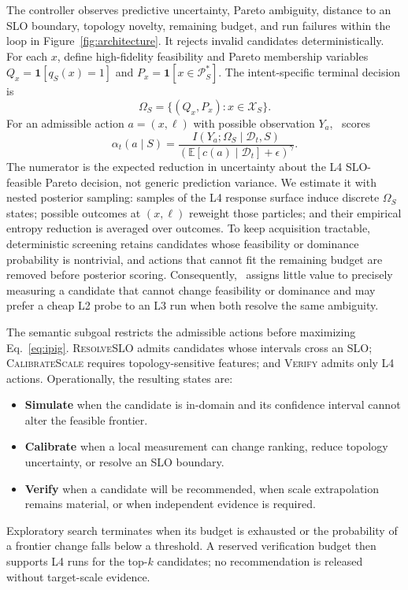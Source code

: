 The controller observes predictive uncertainty, Pareto ambiguity, distance to
an SLO boundary, topology novelty, remaining budget, and run failures within
the loop in Figure~\ref{fig:architecture}.  It rejects invalid candidates
deterministically.  For each $x$, define high-fidelity feasibility and Pareto
membership variables $Q_x=\mathbf 1[q_S(x)=1]$ and
$P_x=\mathbf 1[x\in\mathcal P_S^*]$.  The intent-specific terminal decision is
\begin{equation}
\Omega_S=\{(Q_x,P_x):x\in\mathcal X_S\}.
\end{equation}
For an admissible action $a=(x,\ell)$ with possible observation $Y_a$, \ipig{}\
scores
\begin{equation}
\alpha_t(a\mid S)=
\frac{I(Y_a;\Omega_S\mid\mathcal D_t,S)}
{(\mathbb E[c(a)\mid\mathcal D_t]+\epsilon)^\gamma}.
\label{eq:ipig}
\end{equation}
The numerator is the expected reduction in uncertainty about the L4
SLO-feasible Pareto decision, not generic prediction variance.  We estimate it
with nested posterior sampling: samples of the L4 response surface induce
discrete $\Omega_S$ states; possible outcomes at $(x,\ell)$ reweight those
particles; and their empirical entropy reduction is averaged over outcomes.
To keep acquisition tractable, deterministic screening retains candidates
whose feasibility or dominance probability is nontrivial, and actions that
cannot fit the remaining budget are removed before posterior scoring.
Consequently, \ipig{}\ assigns little value to precisely measuring a candidate
that cannot change feasibility or dominance and may prefer a cheap L2 probe to
an L3 run when both resolve the same ambiguity.

The semantic subgoal restricts the admissible actions before maximizing
Eq.~\ref{eq:ipig}.  \textsc{ResolveSLO} admits candidates whose intervals
cross an SLO; \textsc{CalibrateScale} requires topology-sensitive features;
and \textsc{Verify} admits only L4 actions.  Operationally, the resulting
states are:
\begin{itemize}
    \item \textbf{Simulate} when the candidate is in-domain and its confidence
    interval cannot alter the feasible frontier.
    \item \textbf{Calibrate} when a local measurement can change ranking,
    reduce topology uncertainty, or resolve an SLO boundary.
    \item \textbf{Verify} when a candidate will be recommended, when scale
    extrapolation remains material, or when independent evidence is required.
\end{itemize}
Exploratory search terminates when its budget is exhausted or the probability
of a frontier change falls below a threshold.  A reserved verification budget
then supports L4 runs for the top-$k$ candidates; no recommendation is released
without target-scale evidence.

